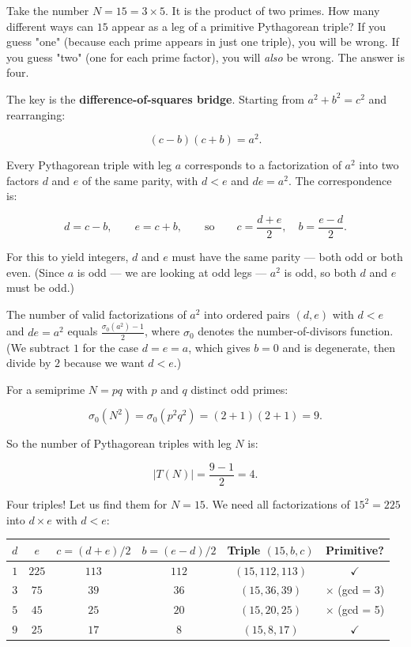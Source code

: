 Take the number $N = 15 = 3 \times 5$. It is the product of two primes. How many different ways can $15$ appear as a leg of a primitive Pythagorean triple? If you guess "one" (because each prime appears in just one triple), you will be wrong. If you guess "two" (one for each prime factor), you will \textit{also} be wrong. The answer is four.

The key is the \textbf{difference-of-squares bridge}. Starting from $a^2 + b^2 = c^2$ and rearranging:

\[
(c - b)(c + b) = a^2.
\]

Every Pythagorean triple with leg $a$ corresponds to a factorization of $a^2$ into two factors $d$ and $e$ of the same parity, with $d < e$ and $de = a^2$. The correspondence is:

\[
d = c - b, \qquad e = c + b, \qquad \text{so} \qquad c = \frac{d + e}{2}, \quad b = \frac{e - d}{2}.
\]

For this to yield integers, $d$ and $e$ must have the same parity --- both odd or both even. (Since $a$ is odd --- we are looking at odd legs --- $a^2$ is odd, so both $d$ and $e$ must be odd.)

The number of valid factorizations of $a^2$ into ordered pairs $(d, e)$ with $d < e$ and $de = a^2$ equals $\frac{\sigma_0(a^2) - 1}{2}$, where $\sigma_0$ denotes the number-of-divisors function. (We subtract $1$ for the case $d = e = a$, which gives $b = 0$ and is degenerate, then divide by $2$ because we want $d < e$.)

For a semiprime $N = pq$ with $p$ and $q$ distinct odd primes:

\[
\sigma_0(N^2) = \sigma_0(p^2 q^2) = (2 + 1)(2 + 1) = 9.
\]

So the number of Pythagorean triples with leg $N$ is:

\[
|T(N)| = \frac{9 - 1}{2} = 4.
\]

Four triples! Let us find them for $N = 15$. We need all factorizations of $15^2 = 225$ into $d \times e$ with $d < e$:

\begin{center}
\begin{tabular}{c c c c c c}
\toprule
$d$ & $e$ & $c = (d+e)/2$ & $b = (e-d)/2$ & Triple $(15, b, c)$ & Primitive? \\
\midrule
$1$ & $225$ & $113$ & $112$ & $(15, 112, 113)$ & \ensuremath{\checkmark} \\
$3$ & $75$ & $39$ & $36$ & $(15, 36, 39)$ & \ensuremath{\times} (gcd = 3) \\
$5$ & $45$ & $25$ & $20$ & $(15, 20, 25)$ & \ensuremath{\times} (gcd = 5) \\
$9$ & $25$ & $17$ & $8$ & $(15, 8, 17)$ & \ensuremath{\checkmark} \\
\bottomrule
\end{tabular}
\end{center}

